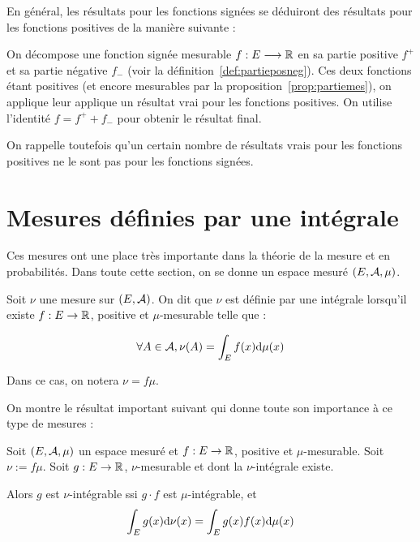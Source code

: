 \documentclass[../integ-proba.tex]{subfiles}
\begin{document}
  En général, les résultats pour les fonctions signées se déduiront des résultats pour les fonctions positives de la manière suivante :
  \begin{itemize}
    \itemb On décompose une fonction signée mesurable $f:E\longrightarrow\mathbb{R}$ en sa partie positive $f^+$ et sa partie négative $f_-$ (voir la définition~\ref{def:partieposneg}).
    \itemb Ces deux fonctions étant positives (et encore mesurables par la proposition~\ref{prop:partiemes}), on applique leur applique un résultat vrai pour les fonctions positives.
    \itemb On utilise l'identité $f=f^++f_-$ pour obtenir le résultat final.
  \end{itemize}

  On rappelle toutefois qu'un certain nombre de résultats vrais pour les fonctions positives ne le sont pas pour les fonctions signées.


  \section{Mesures définies par une intégrale}
  \label{sec:mes_defi_int}

  Ces mesures ont une place très importante dans la théorie de la mesure et en probabilités.
  Dans toute cette section, on se donne un espace mesuré $\left(E, \mathcal{A}, \mu\right)$.

  \begin{defi}
    Soit $\nu$ une mesure sur $\left(E, \mathcal{A}\right)$.
    On dit que $\nu$ est définie par une intégrale lorsqu'il existe $f:E \rightarrow \mathbb{R}$, positive et $\mu$-mesurable telle que :

    \begin{displaymath}
      \forall A \in \mathcal{A}, \nu(A)=\int_E f(x) \text{d} \mu(x)
    \end{displaymath}

    Dans ce cas, on notera $\nu = f \mu$.
  \end{defi}

  On montre le résultat important suivant qui donne toute son importance à ce type de mesures :

  \begin{thm}
    \label{thm:avantage_densite}
        Soit $\left( E, \mathcal{A}, \mu \right)$ un espace mesuré et $f:E \rightarrow \mathbb{R}$, positive et $\mu$-mesurable.
        Soit $\nu:=f \mu$.
        Soit $g: E \rightarrow \mathbb{R}$, $\nu$-mesurable et dont la $\nu$-intégrale existe.

        Alors $g$ est $\nu$-intégrable ssi $g \cdot f$ est $\mu$-intégrable, et
        \begin{displaymath}
          \int_E g(x) \textnormal{d} \nu(x) = \int_E g(x) f(x) \textnormal{d} \mu(x)
        \end{displaymath}
    \end{thm}
\end{document}

